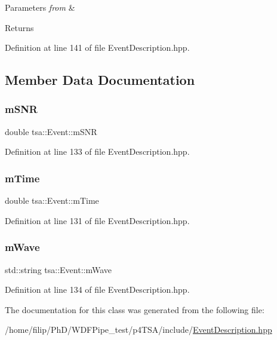 \begin{DoxyParams}{Parameters}
{\em from} & \\
\hline
\end{DoxyParams}
\begin{DoxyReturn}{Returns}

\end{DoxyReturn}


Definition at line 141 of file Event\+Description.\+hpp.



\subsection{Member Data Documentation}
\mbox{\label{classtsa_1_1_event_a740dc0ff8eb9379a52541fe00ab7c293}} 
\subsubsection{\texorpdfstring{m\+S\+NR}{mSNR}}
{\footnotesize\ttfamily double tsa\+::\+Event\+::m\+S\+NR}



Definition at line 133 of file Event\+Description.\+hpp.

\mbox{\label{classtsa_1_1_event_ac0e06c387142f5f986e1fa40f0b196a0}} 
\subsubsection{\texorpdfstring{m\+Time}{mTime}}
{\footnotesize\ttfamily double tsa\+::\+Event\+::m\+Time}



Definition at line 131 of file Event\+Description.\+hpp.

\mbox{\label{classtsa_1_1_event_abbb6ba2540bacfea050d8074d6dd1482}} 
\subsubsection{\texorpdfstring{m\+Wave}{mWave}}
{\footnotesize\ttfamily std\+::string tsa\+::\+Event\+::m\+Wave}



Definition at line 134 of file Event\+Description.\+hpp.



The documentation for this class was generated from the following file\+:\begin{DoxyCompactItemize}
\item 
/home/filip/\+Ph\+D/\+W\+D\+F\+Pipe\+\_\+test/p4\+T\+S\+A/include/\hyperlink{_event_description_8hpp}{Event\+Description.\+hpp}\end{DoxyCompactItemize}
